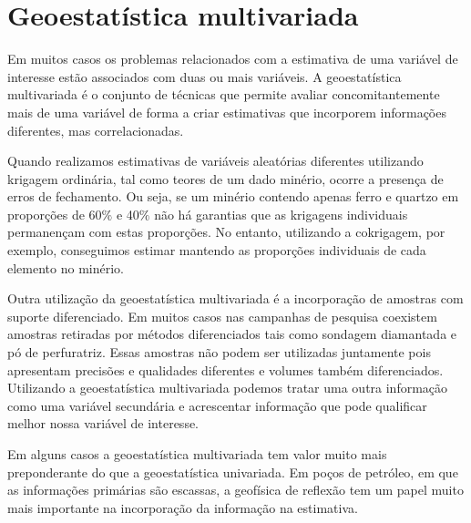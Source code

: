 \appendix


\chapter{Geoestatística multivariada}

Em muitos casos os problemas relacionados com a estimativa de uma variável de interesse estão associados com duas ou mais variáveis. A geoestatística multivariada é o conjunto de técnicas que permite avaliar concomitantemente  mais de uma variável de forma a criar estimativas que incorporem informações diferentes, mas correlacionadas. 

Quando realizamos estimativas de variáveis aleatórias diferentes utilizando krigagem ordinária, tal como teores de um dado minério, ocorre a presença de erros de fechamento. Ou seja, se um minério contendo apenas ferro e quartzo em proporções de 60$\%$ e 40$\% $ não há garantias que as krigagens individuais permanençam com estas proporções. No entanto, utilizando a cokrigagem, por exemplo, conseguimos estimar mantendo as proporções individuais de cada elemento no minério. 

Outra utilização da geoestatística multivariada é a incorporação de amostras com suporte diferenciado. Em muitos casos nas campanhas de pesquisa coexistem amostras retiradas por métodos diferenciados tais como sondagem diamantada e pó de perfuratriz. Essas amostras não podem ser utilizadas juntamente pois apresentam precisões e qualidades diferentes e volumes também diferenciados. Utilizando a geoestatística multivariada podemos tratar uma outra informação como uma variável secundária e acrescentar informação que pode qualificar melhor nossa variável de interesse. 

Em alguns casos a geoestatística multivariada tem valor muito mais preponderante do que a geoestatística univariada. Em poços de petróleo, em que as informações primárias são escassas, a geofísica de reflexão tem um papel muito mais importante na incorporação da informação na estimativa.

